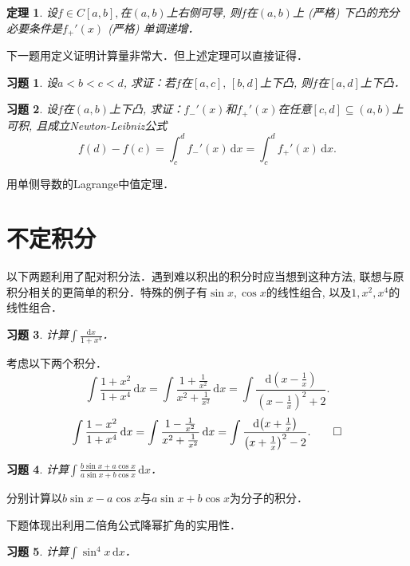 \documentclass[11pt,a4paper]{ctexart}
\makeatletter
\theoremstyle{thmseries} %
\newtheorem{thm}{定理}[section]
\theoremstyle{exerseries}
\newtheorem{exer}{习题}[section]
\renewenvironment{proof}[1][\proofname]{\par
  \pushQED{\qed}%
  \normalfont \topsep6\p@\@plus6\p@\relax
  \trivlist
  \item[\hskip\labelsep
        \itshape
    #1\@addpunct{}]\ignorespaces
}{%
  \popQED\endtrivlist\@endpefalse
}
\newenvironment{sol}{\begin{proof}[\bfseries\upshape 解\quad]}{\end{proof}}
\newenvironment{pf}{\begin{proof}[\bfseries\upshape 证\quad]}{\end{proof}}
\newcommand{\bra}[1]{\mathopen{}\left(#1\right)}
\renewcommand{\d}{\mathrm{d}}
\makeatother
\begin{document}
\begin{thm}
	设$f\in C[a,b],$在$(a,b)$上右侧可导, 则$f$在$(a,b)$上 (严格) 下凸的充分必要条件是$f_+'(x)$ (严格) 单调递增．
\end{thm}

下一题用定义证明计算量非常大．但上述定理可以直接证得．
\begin{exer}
	设$a<b<c<d$, 求证：若$f$在$[a,c],\,[b,d]$上下凸, 则$f$在$[a,d]$上下凸．
\end{exer}

\begin{exer}
	设$f$在$(a,b)$上下凸, 求证：$f_-'(x)$和$f_+'(x)$在任意$[c,d]\subseteq(a,b)$上可积, 且成立Newton-Leibniz公式
	\[f(d)-f(c)=\int_{c}^{d}f_-'(x)\,\d x=\int_{c}^{d}f_+'(x)\,\d x.\]
\end{exer}
\begin{pf}
	用单侧导数的Lagrange中值定理．
\end{pf}


\section{不定积分}
以下两题利用了配对积分法．遇到难以积出的积分时应当想到这种方法, 联想与原积分相关的更简单的积分．特殊的例子有$\sin x,\cos x$的线性组合, 以及$1,x^2,x^4$的线性组合．
\begin{exer}
	计算$\int\frac{\d x}{1+x^4}$．
\end{exer}
\begin{sol}
	考虑以下两个积分．
	\[\int\frac{1+x^2}{1+x^4}\,\d x=\int\frac{1+\frac{1}{x^2}}{x^2+\frac{1}{x^2}}\,\d x=\int\frac{\d\bra{x-\frac{1}{x}}}{\bra{x-\frac{1}{x}}^2+2}.\]
	\[\int\frac{1-x^2}{1+x^4}\,\d x=\int\frac{1-\frac{1}{x^2}}{x^2+\frac{1}{x^2}}\,\d x=\int\frac{\d\bra{x+\frac{1}{x}}}{\bra{x+\frac{1}{x}}^2-2}.\qedhere\]
\end{sol}

\begin{exer}
	计算$\int\frac{b\sin x+a\cos x}{a\sin x+b\cos x}\,\d x$．
\end{exer}
\begin{sol}
	分别计算以$b\sin x-a\cos x$与$a\sin x+b\cos x$为分子的积分．
\end{sol}

下题体现出利用二倍角公式降幂扩角的实用性．
\begin{exer}
	计算$\int \sin^4x\,\d x$．
\end{exer}

\end{document}
